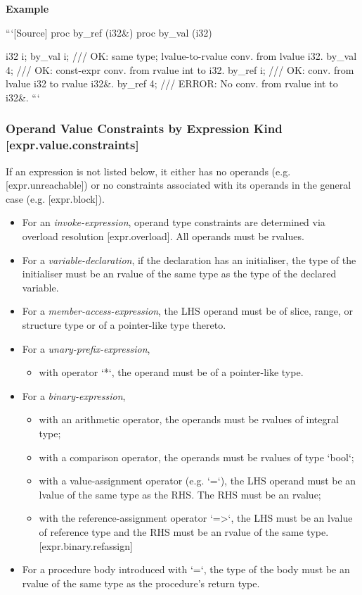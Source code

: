 \documentclass[a4paper, 12pt, oneside, final]{article}
\def\sref[#1]{[#1]}
\def\Example{\ifvmode\else\unskip\par\fi\noindent \textbf{Example}\par}
\begin{document}
\Example
```[Source]
proc by_ref (i32&) {}
proc by_val (i32) {}

i32 i;
by_val i; /// OK: same type; lvalue-to-rvalue conv. from lvalue i32.
by_val 4; /// OK: const-expr conv. from rvalue int to i32.
by_ref i; /// OK: conv. from lvalue i32 to rvalue i32&.
by_ref 4; /// ERROR: No conv. from rvalue int to i32&.
```

\subsubsection{Operand Value Constraints by Expression Kind [expr.value.constraints]}
If an expression is not listed below, it either has no operands (e.g. \sref[expr.unreachable]) or no constraints
associated with its operands in the general case (e.g. \sref[expr.block]).

\begin{itemize}
\item For an \emph{invoke-expression}, operand type constraints are determined via overload resolution \sref[expr.overload].
      All operands must be rvalues.
\item For a \emph{variable-declaration}, if the declaration has an initialiser, the type of the initialiser must be
      an rvalue of the same type as the type of the declared variable.
\item For a \emph{member-access-expression}, the LHS operand must be of slice, range, or structure type or of
      a pointer-like type thereto.
\item For a \emph{unary-prefix-expression},
      \begin{itemize}
        \item with operator `*`, the operand must be of a pointer-like type.
      \end{itemize}
\item For a \emph{binary-expression},
      \begin{itemize}
          \item with an arithmetic operator, the operands must be rvalues of integral type;
          \item with a comparison operator, the operands must be rvalues of type `bool`;
          \item with a value-assignment operator (e.g. `=`), the LHS operand must be an lvalue
                of the same type as the RHS. The RHS must be an rvalue;
          \item with the reference-assignment operator `=>`, the LHS must be an lvalue of reference type
                and the RHS must be an rvalue of the same type. \sref[expr.binary.refassign]
      \end{itemize}
\item For a procedure body introduced with `=`, the type of the body must be an rvalue of the same
      type as the procedure’s return type.
\end{itemize}
\end{document}
